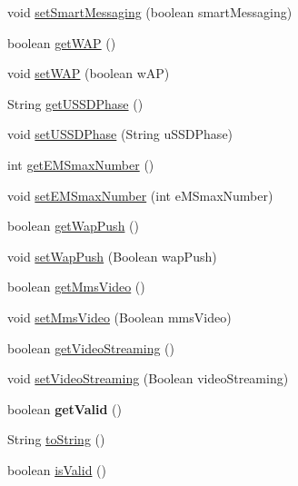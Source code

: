 \begin{DoxyCompactItemize}
void \hyperlink{classcom_1_1bluevia_1_1directory_1_1data_1_1TerminalInfo_ac8de16db7a7d088880ec74d4111a3964}{setSmartMessaging} (boolean smartMessaging)
\item 
boolean \hyperlink{classcom_1_1bluevia_1_1directory_1_1data_1_1TerminalInfo_ac34b467789299dbedfa866a30a21322e}{getWAP} ()
\item 
void \hyperlink{classcom_1_1bluevia_1_1directory_1_1data_1_1TerminalInfo_a1b289f786533475a5daee8390db34857}{setWAP} (boolean wAP)
\item 
String \hyperlink{classcom_1_1bluevia_1_1directory_1_1data_1_1TerminalInfo_a75b3fb4c5b929f5d74b426243c1aae33}{getUSSDPhase} ()
\item 
void \hyperlink{classcom_1_1bluevia_1_1directory_1_1data_1_1TerminalInfo_a5a6a57f7dcdcb48a17b145dbe756f59b}{setUSSDPhase} (String uSSDPhase)
\item 
int \hyperlink{classcom_1_1bluevia_1_1directory_1_1data_1_1TerminalInfo_a640e2ceed7707c3ae6d39f6080b6416b}{getEMSmaxNumber} ()
\item 
void \hyperlink{classcom_1_1bluevia_1_1directory_1_1data_1_1TerminalInfo_a6adae537bed602c73afedf05d8247fcf}{setEMSmaxNumber} (int eMSmaxNumber)
\item 
boolean \hyperlink{classcom_1_1bluevia_1_1directory_1_1data_1_1TerminalInfo_a60d755404e3617caa8de2369887d6c36}{getWapPush} ()
\item 
void \hyperlink{classcom_1_1bluevia_1_1directory_1_1data_1_1TerminalInfo_ae3fdc79961add1aeefd6ec7bac27d768}{setWapPush} (Boolean wapPush)
\item 
boolean \hyperlink{classcom_1_1bluevia_1_1directory_1_1data_1_1TerminalInfo_a8db01ae5f209e230e367746189cae4d4}{getMmsVideo} ()
\item 
void \hyperlink{classcom_1_1bluevia_1_1directory_1_1data_1_1TerminalInfo_ac4666d43eb4fe52971cda5ce9a2b8af4}{setMmsVideo} (Boolean mmsVideo)
\item 
boolean \hyperlink{classcom_1_1bluevia_1_1directory_1_1data_1_1TerminalInfo_a70220d902f2d32ec69c70f6ab6315ee2}{getVideoStreaming} ()
\item 
void \hyperlink{classcom_1_1bluevia_1_1directory_1_1data_1_1TerminalInfo_ae4e638733acffdc0d22199bc6574f75c}{setVideoStreaming} (Boolean videoStreaming)
\item 
\hypertarget{classcom_1_1bluevia_1_1directory_1_1data_1_1TerminalInfo_a8353fc78a00d7e45bc8efff2ca37767c}{
boolean {\bfseries getValid} ()}
\label{classcom_1_1bluevia_1_1directory_1_1data_1_1TerminalInfo_a8353fc78a00d7e45bc8efff2ca37767c}

\item 
String \hyperlink{classcom_1_1bluevia_1_1directory_1_1data_1_1TerminalInfo_ac29173b430f5c35823188c76f697b1a1}{toString} ()
\item 
boolean \hyperlink{classcom_1_1bluevia_1_1directory_1_1data_1_1TerminalInfo_af99acb26582d9d7e84391ee738d8d780}{isValid} ()
\end{DoxyCompactItemize}


